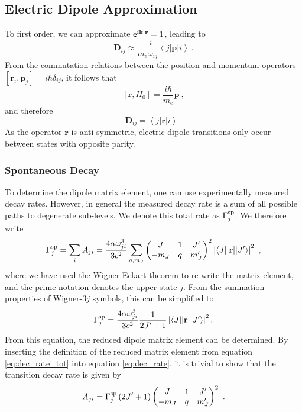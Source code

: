 \documentclass{article}
\begin{document}
\subsection{Electric Dipole Approximation}\label{sec:ED}
To first order, we can approximate ${\rm{e}}^{i\mathbf{k}\cdot\mathbf{r}} = 1$, leading to 
\begin{equation}
     \mathbf{D}_{ij} \approx \frac{-i}{m_e\omega_{ij}}\left\langle j \left| \mathbf{p} \right| i\right\rangle~.
\end{equation}  
From the commutation relations between the position and momentum operators $\left[\mathbf{r}_i, \mathbf{p}_j\right] = i\hbar \delta_{ij}$, it follows that 
\begin{equation}
    \left[\mathbf{r}, H_0\right] = \frac{i\hbar}{m_e}\mathbf{p}~,
\end{equation}
and therefore 
\begin{equation}
    \mathbf{D}_{ij} = \left\langle j \left|\mathbf{r}\right| i\right\rangle~.
\end{equation}
As the operator $\mathbf{r}$ is anti-symmetric, electric dipole transitions only occur between states with opposite parity.

\subsubsection{Spontaneous Decay}
To determine the dipole matrix element, one can use experimentally measured decay rates. However, in general the measured decay rate is a sum of all possible paths to degenerate sub-levels. We denote this total rate as $\Gamma^{\rm{sp}}_j$. We therefore write 
\begin{equation} \label{eq:dec_rate}
    \Gamma^{\rm{sp}}_j = \sum_{i} A_{ji}
    = \frac{4 \alpha \omega_{ji}^3}{3 c^2} \sum_{q, m_J} 
    \begin{pmatrix}
    J & 1 & J'\\
    -m_J & q & m_J'
    \end{pmatrix}^2 \left|\left\langle J||\mathbf{r}||J'\right\rangle\right|^2~,
\end{equation}
where we have used the Wigner-Eckart theorem to re-write the matrix element, and the prime notation denotes the upper state $j$. From the summation properties of Wigner-$3j$ symbols, this can be simplified to  
\begin{equation} \label{eq:dec_rate_tot}
    \Gamma^{\rm{sp}}_j = \frac{4\alpha\omega_{ji}^3}{3c^2} \frac{1}{2J'+1} \left|\left\langle J||\mathbf{r}||J'\right\rangle\right|^2.
\end{equation}
From this equation, the reduced dipole matrix element can be determined. By inserting the definition of the reduced matrix element from equation \ref{eq:dec_rate_tot} into equation \ref{eq:dec_rate}, it is trivial to show that the transition decay rate is given by
\begin{equation}
   A_{ji} = \Gamma^{\rm{sp}}_j \left(2J'+1\right)  \begin{pmatrix}
    J & 1 & J'\\
    -m_J & q & m_J'
    \end{pmatrix}^2~.
\end{equation}
\end{document}
